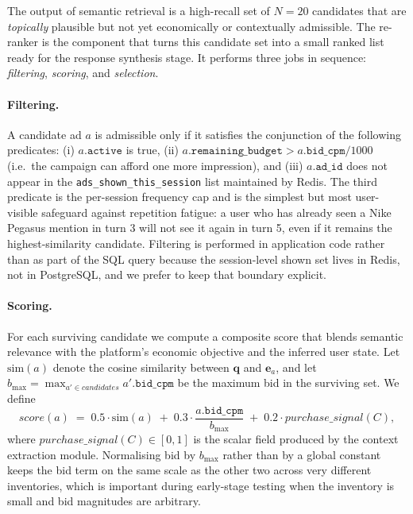 The output of semantic retrieval is a high-recall set of $N=20$ candidates
that are \emph{topically} plausible but not yet economically or contextually
admissible. The re-ranker is the component that turns this candidate set into
a small ranked list ready for the response synthesis stage. It performs three
jobs in sequence: \emph{filtering}, \emph{scoring}, and \emph{selection}.

\paragraph{Filtering.} A candidate ad $a$ is admissible only if it satisfies
the conjunction of the following predicates: (i) $a.\texttt{active}$ is true,
(ii) $a.\texttt{remaining\_budget} > a.\texttt{bid\_cpm}/1000$ (i.e.\ the
campaign can afford one more impression), and (iii) $a.\texttt{ad\_id}$ does
not appear in the \texttt{ads\_shown\_this\_session} list maintained by Redis.
The third predicate is the per-session frequency cap and is the simplest but
most user-visible safeguard against repetition fatigue: a user who has
already seen a Nike Pegasus mention in turn 3 will not see it again in turn 5,
even if it remains the highest-similarity candidate. Filtering is performed
in application code rather than as part of the SQL query because the
session-level shown set lives in Redis, not in PostgreSQL, and we prefer to
keep that boundary explicit.

\paragraph{Scoring.} For each surviving candidate we compute a composite
score that blends semantic relevance with the platform's economic objective
and the inferred user state. Let $\mathrm{sim}(a)$ denote the cosine
similarity between $\mathbf{q}$ and $\mathbf{e}_a$, and let
$b_{\max} = \max_{a' \in \mathit{candidates}} a'.\texttt{bid\_cpm}$ be the
maximum bid in the surviving set. We define
\[
    \mathit{score}(a) \;=\;
    0.5 \cdot \mathrm{sim}(a)
    \;+\; 0.3 \cdot \frac{a.\texttt{bid\_cpm}}{b_{\max}}
    \;+\; 0.2 \cdot \mathit{purchase\_signal}(C),
\]
where $\mathit{purchase\_signal}(C) \in [0,1]$ is the scalar field produced
by the context extraction module. Normalising bid by $b_{\max}$ rather than
by a global constant keeps the bid term on the same scale as the other two
across very different inventories, which is important during early-stage
testing when the inventory is small and bid magnitudes are arbitrary.

